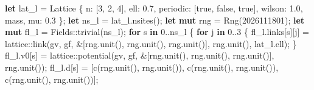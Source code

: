 \documentclass[
  10pt,
]{article}
\newenvironment{Shaded}{}{}
\newcommand{\ConstantTok}[1]{\textcolor[rgb]{0.53,0.00,0.00}{#1}}
\newcommand{\ControlFlowTok}[1]{\textcolor[rgb]{0.00,0.44,0.13}{\textbf{#1}}}
\newcommand{\DecValTok}[1]{\textcolor[rgb]{0.25,0.63,0.44}{#1}}
\newcommand{\KeywordTok}[1]{\textcolor[rgb]{0.00,0.44,0.13}{\textbf{#1}}}
\newcommand{\NormalTok}[1]{#1}
\newcommand{\OperatorTok}[1]{\textcolor[rgb]{0.40,0.40,0.40}{#1}}
\newcommand{\PreprocessorTok}[1]{\textcolor[rgb]{0.74,0.48,0.00}{#1}}
\begin{document}
\begin{Shaded}
\begin{Highlighting}[]
    \KeywordTok{let}\NormalTok{ lat\_l }\OperatorTok{=}\NormalTok{ Lattice }\OperatorTok{\{}\NormalTok{ n}\OperatorTok{:}\NormalTok{ [}\DecValTok{3}\OperatorTok{,} \DecValTok{2}\OperatorTok{,} \DecValTok{4}\NormalTok{]}\OperatorTok{,}\NormalTok{ ell}\OperatorTok{:} \DecValTok{0.7}\OperatorTok{,}\NormalTok{ periodic}\OperatorTok{:}\NormalTok{ [}\ConstantTok{true}\OperatorTok{,} \ConstantTok{false}\OperatorTok{,} \ConstantTok{true}\NormalTok{]}\OperatorTok{,}\NormalTok{ wilson}\OperatorTok{:} \DecValTok{1.0}\OperatorTok{,}\NormalTok{ mass}\OperatorTok{,}\NormalTok{ mu}\OperatorTok{:} \DecValTok{0.3} \OperatorTok{\};}
    \KeywordTok{let}\NormalTok{ ns\_l }\OperatorTok{=}\NormalTok{ lat\_l}\OperatorTok{.}\NormalTok{nsites()}\OperatorTok{;}
    \KeywordTok{let} \KeywordTok{mut}\NormalTok{ rng }\OperatorTok{=}\NormalTok{ Rng(}\DecValTok{2026111801}\NormalTok{)}\OperatorTok{;}
    \KeywordTok{let} \KeywordTok{mut}\NormalTok{ fl\_l }\OperatorTok{=} \PreprocessorTok{Fields::}\NormalTok{trivial(ns\_l)}\OperatorTok{;}
    \ControlFlowTok{for}\NormalTok{ s }\KeywordTok{in} \DecValTok{0}\OperatorTok{..}\NormalTok{ns\_l }\OperatorTok{\{}
        \ControlFlowTok{for}\NormalTok{ j }\KeywordTok{in} \DecValTok{0}\OperatorTok{..}\DecValTok{3} \OperatorTok{\{}
\NormalTok{            fl\_l}\OperatorTok{.}\NormalTok{links[s][j] }\OperatorTok{=} \PreprocessorTok{lattice::}\NormalTok{link(gv}\OperatorTok{,}\NormalTok{ gf}\OperatorTok{,} \OperatorTok{\&}\NormalTok{[rng}\OperatorTok{.}\NormalTok{unit()}\OperatorTok{,}\NormalTok{ rng}\OperatorTok{.}\NormalTok{unit()}\OperatorTok{,}\NormalTok{ rng}\OperatorTok{.}\NormalTok{unit()]}\OperatorTok{,}\NormalTok{ rng}\OperatorTok{.}\NormalTok{unit()}\OperatorTok{,}\NormalTok{ lat\_l}\OperatorTok{.}\NormalTok{ell)}\OperatorTok{;}
        \OperatorTok{\}}
\NormalTok{        fl\_l}\OperatorTok{.}\NormalTok{v0[s] }\OperatorTok{=} \PreprocessorTok{lattice::}\NormalTok{potential(gv}\OperatorTok{,}\NormalTok{ gf}\OperatorTok{,} \OperatorTok{\&}\NormalTok{[rng}\OperatorTok{.}\NormalTok{unit()}\OperatorTok{,}\NormalTok{ rng}\OperatorTok{.}\NormalTok{unit()}\OperatorTok{,}\NormalTok{ rng}\OperatorTok{.}\NormalTok{unit()]}\OperatorTok{,}\NormalTok{ rng}\OperatorTok{.}\NormalTok{unit())}\OperatorTok{;}
\NormalTok{        fl\_l}\OperatorTok{.}\NormalTok{d[s] }\OperatorTok{=}\NormalTok{ [c(rng}\OperatorTok{.}\NormalTok{unit()}\OperatorTok{,}\NormalTok{ rng}\OperatorTok{.}\NormalTok{unit())}\OperatorTok{,}\NormalTok{ c(rng}\OperatorTok{.}\NormalTok{unit()}\OperatorTok{,}\NormalTok{ rng}\OperatorTok{.}\NormalTok{unit())}\OperatorTok{,}\NormalTok{ c(rng}\OperatorTok{.}\NormalTok{unit()}\OperatorTok{,}\NormalTok{ rng}\OperatorTok{.}\NormalTok{unit())]}\OperatorTok{;}

\end{Highlighting}
\end{Shaded}
\end{document}
